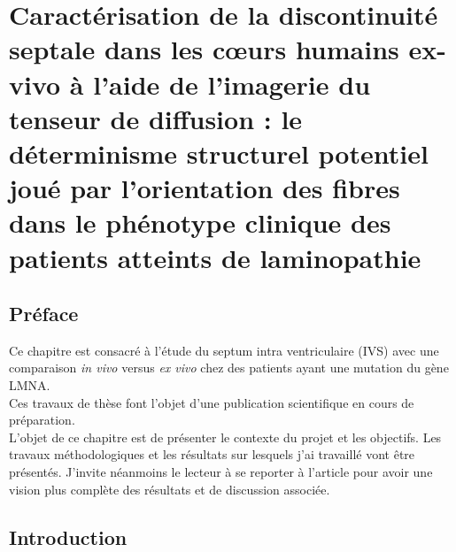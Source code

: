 \chapter{Caractérisation de la discontinuité septale dans les cœurs humains ex-vivo à l'aide de l'imagerie du tenseur de diffusion : le déterminisme structurel potentiel joué par l'orientation des fibres dans le phénotype clinique des patients atteints de laminopathie}

\label{chap:LMNA}
\minitoc

\section{Préface}

Ce chapitre est consacré à l’étude du septum intra ventriculaire (IVS) avec une comparaison \textit{in vivo} versus \textit{ex vivo} chez des patients ayant une mutation du gène LMNA. 
\\
Ces travaux de thèse font l’objet d’une publication scientifique en cours de préparation.
\\
L’objet de ce chapitre est de présenter le contexte du projet et les objectifs. Les travaux méthodologiques et les résultats sur lesquels j’ai travaillé vont être présentés. J’invite néanmoins le lecteur à se reporter à l’article pour avoir une vision plus complète des résultats et de discussion associée. 

\section{Introduction}

